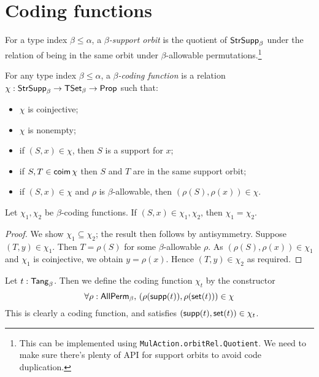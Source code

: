 \section{Coding functions}
\begin{definition}
  \label{def:SupportOrbit}
  For a type index \( \beta \leq \alpha \), a \emph{\( \beta \)-support orbit} is the quotient of \( \mathsf{StrSupp}_\beta \) under the relation of being in the same orbit under \( \beta \)-allowable permutations.\footnote{This can be implemented using \texttt{MulAction.orbitRel.Quotient}. We need to make sure there's plenty of API for support orbits to avoid code duplication.}
\end{definition}
\begin{definition}
  \label{def:CodingFunction}
  For any type index \( \beta \leq \alpha \), a \emph{\( \beta \)-coding function} is a relation \( \chi : \mathsf{StrSupp}_\beta \to \mathsf{TSet}_\beta \to \mathsf{Prop} \) such that:
  \begin{itemize}
    \item \( \chi \) is coinjective;
    \item \( \chi \) is nonempty;
    \item if \( (S, x) \in \chi \), then \( S \) is a support for \( x \);
    \item if \( S, T \in \operatorname{\mathsf{coim}} \chi \) then \( S \) and \( T \) are in the same support orbit;
    \item if \( (S, x) \in \chi \) and \( \rho \) is \( \beta \)-allowable, then \( (\rho(S), \rho(x)) \in \chi \).
  \end{itemize}
\end{definition}
\begin{proposition}
  \label{prop:CodingFunction.ext}
  Let \( \chi_1, \chi_2 \) be \( \beta \)-coding functions.
  If \( (S, x) \in \chi_1, \chi_2 \), then \( \chi_1 = \chi_2 \).
\end{proposition}
\begin{proof}
  We show \( \chi_1 \subseteq \chi_2 \); the result then follows by antisymmetry.
  Suppose \( (T, y) \in \chi_1 \).
  Then \( T = \rho(S) \) for some \( \beta \)-allowable \( \rho \).
  As \( (\rho(S), \rho(x)) \in \chi_1 \) and \( \chi_1 \) is coinjective, we obtain \( y = \rho(x) \).
  Hence \( (T, y) \in \chi_2 \) as required.
\end{proof}
\begin{definition}
  \label{def:code}
  Let \( t : \mathsf{Tang}_\beta \).
  Then we define the coding function \( \chi_t \) by the constructor
  \[ \forall \rho : \mathsf{AllPerm}_\beta,\, (\rho(\operatorname{\mathsf{supp}}(t)), \rho(\operatorname{\mathsf{set}}(t))) \in \chi \]
  This is clearly a coding function, and satisfies \( (\operatorname{\mathsf{supp}}(t), \operatorname{\mathsf{set}}(t)) \in \chi_t \).
\end{definition}

